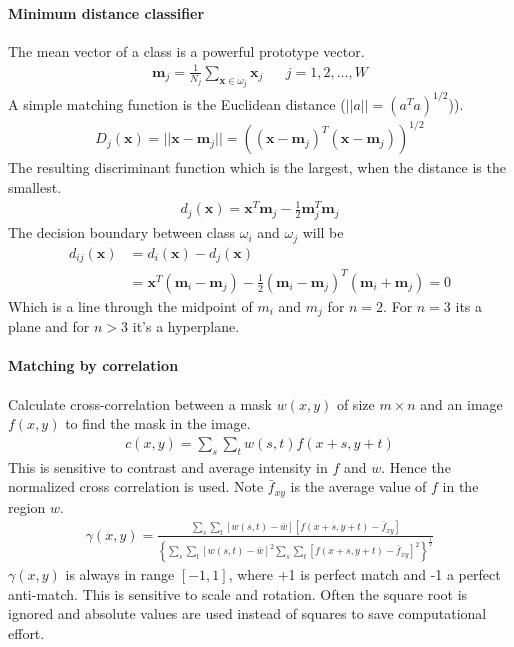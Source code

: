 \paragraph{Minimum distance classifier}
The mean vector of a class is a powerful prototype vector.
\begin{align*}
	\mathbf{m}_j = \frac{1}{N_j} \sum_{\mathbf{x} \in \omega_j}\mathbf{x}_j && j = 1,2,\dots, W
\end{align*}
A simple matching function is the Euclidean distance ($||a|| = (a^Ta)^{1/2}$)).
\begin{align*}
	D_j(\mathbf{x}) = ||\mathbf{x}-\mathbf{m}_j|| = \left((\mathbf{x}-\mathbf{m}_j)^T(\mathbf{x}-\mathbf{m}_j)\right)^{1/2}
\end{align*}
The resulting discriminant function which is the largest, when the distance is
the smallest.
\begin{align*}
	d_j(\mathbf{x}) = \mathbf{x}^T \mathbf{m}_j - \frac{1}{2}\mathbf{m}_j^T \mathbf{m}_j
\end{align*}
The decision boundary between class $\omega_i$ and $\omega_j$ will be
\begin{align*}
	d_{ij}(\mathbf{x}) &= d_i(\mathbf{x}) - d_j(\mathbf{x})\\
	&= \mathbf{x}^T(\mathbf{m}_i-\mathbf{m}_j) - \frac{1}{2}(\mathbf{m}_i-\mathbf{m}_j)^T(\mathbf{m}_i+\mathbf{m}_j) = 0
\end{align*}
Which is a line through the midpoint of $m_i$ and $m_j$ for $n=2$.
For $n=3$ its a plane and for $n>3$ it's a hyperplane.

\paragraph{Matching by correlation}
Calculate cross-correlation between a mask $w(x,y)$ of size $m\times n$ and an image
$f(x,y)$ to find the mask in the image.
\begin{align*}
	c(x,y) = \sum_s\sum_tw(s,t)f(x+s,y+t)
\end{align*}
This is sensitive to contrast and average intensity in $f$ and $w$.
Hence the normalized cross correlation is used.
Note $\bar{f}_{xy}$ is the average value of $f$ in the region $w$.
\begin{align*}
	\gamma(x,y) = \frac{\sum_s\sum_t\left[w(s,t)-\bar{w}\right]\left[f(x+s,y+t)-\bar f_{xy}\right]}
	{
	\left\lbrace
		\sum_s\sum_t\left[w(s,t)-\bar w\right]^2
		\sum_s\sum_t\left[f(x+s,y+t)-\bar f_{xy}\right]^2
	\right\rbrace^{\frac{1}{2}}
	}
\end{align*}
$\gamma(x,y)$ is always in range $[-1, 1]$, where +1 is perfect match and -1 a perfect anti-match.
This is sensitive to scale and rotation.
Often the square root is ignored and absolute values are used instead of squares to save computational effort.

